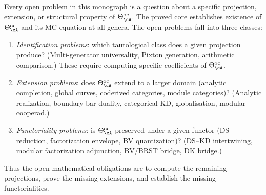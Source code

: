 \begin{remark}
\label{rem:theta-oc-meta-principle}
Every open problem in this monograph is a question about
a specific projection, extension, or structural property of
$\Theta^{\mathrm{oc}}_\cA$. The proved core establishes
existence of $\Theta^{\mathrm{oc}}_\cA$ and its MC equation
at all genera. The open problems fall into three classes:
\begin{enumerate}[label=\textup{(\alph*)}]
\item \emph{Identification problems}: which tautological class
 does a given projection produce?
 (Multi-generator universality, Pixton generation, arithmetic
 comparison.) These require computing specific coefficients
 of $\Theta^{\mathrm{oc}}_\cA$.
\item \emph{Extension problems}: does $\Theta^{\mathrm{oc}}_\cA$
 extend to a larger domain (analytic completion, global curves,
 coderived categories, module categories)?
 (Analytic realization, boundary bar duality, categorical KD,
 globalisation, modular cooperad.)
\item \emph{Functoriality problems}: is $\Theta^{\mathrm{oc}}_\cA$
 preserved under a given functor (DS reduction, factorization
 envelope, BV quantization)?
 (DS--KD intertwining, modular factorization adjunction, BV/BRST bridge,
 DK bridge.)
\end{enumerate}
Thus the open mathematical obligations are to compute the remaining
projections, prove the missing extensions, and establish the missing
functorialities.
\end{remark}

